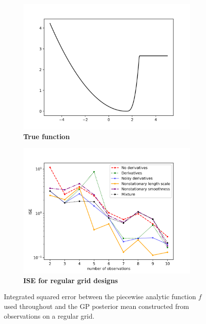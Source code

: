 \documentclass{article}
\numberwithin{equation}{section}
\begin{document}
\begin{figure}
		\centering
		\captionsetup{justification=centering}
    \begin{subfigure}[b]{.5\textwidth}
      \centering
      \includegraphics[scale=0.4]{figures/kink.png}
      \caption{\textbf{True function}}
    \end{subfigure}%
    \begin{subfigure}[b]{.5\textwidth}
      \centering
      \includegraphics[scale=0.4]{figures/regular-1D-all.png}
      \caption{\textbf{ISE for regular grid designs}}
    \end{subfigure}
		\caption{Integrated squared error between the piecewise analytic function $f$ used throughout and the GP posterior mean constructed from observations on a regular grid.}
		\label{regular-1D}
\end{figure}
\end{document}
